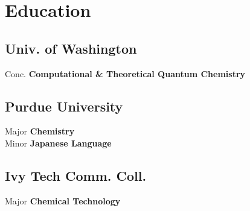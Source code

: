 \documentclass[letterpaper]{deedy-resume} %
\begin{document}
\begin{minipage}[t]{0.32\textwidth} %



\section{Education} 
\subsection{Univ. of Washington}
Conc. \textbf{Computational \& Theoretical Quantum Chemistry}

\sectionspace %


\subsection{Purdue University}
Major \textbf{Chemistry}\\
Minor \textbf{Japanese Language}

\sectionspace

\subsection{Ivy Tech Comm. Coll.}
Major \textbf{Chemical Technology}



\end{minipage}
\end{document}

